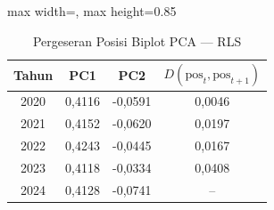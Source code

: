 \begin{table}[H]
\centering
\caption{Pergeseran Posisi Biplot PCA --- RLS} \label{tab:appjarak_pca_loading_rls}
\begin{adjustbox}{max width=\textwidth, max height=0.85\textheight}
\begin{tabular}{|c|c|c|c|}
\hline
\textbf{Tahun} & \textbf{PC1} & \textbf{PC2} & \textbf{$D(\text{pos}_t, \text{pos}_{t+1})$} \\
\hline
2020 & 0,4116 & -0,0591 & 0,0046 \\
2021 & 0,4152 & -0,0620 & 0,0197 \\
2022 & 0,4243 & -0,0445 & 0,0167 \\
2023 & 0,4118 & -0,0334 & 0,0408 \\
2024 & 0,4128 & -0,0741 & -- \\
\hline
\end{tabular}
\end{adjustbox}
\end{table}